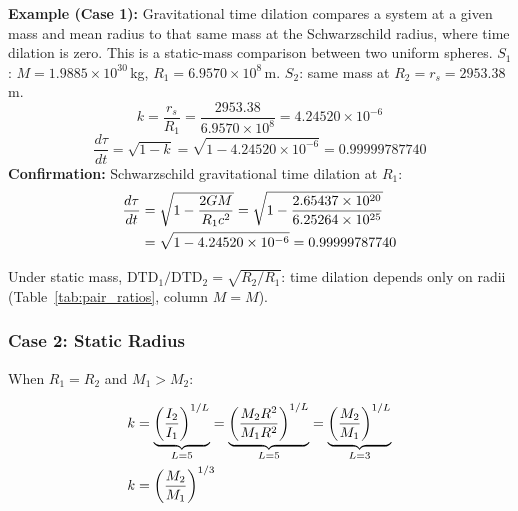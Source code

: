 \documentclass[twoside,twocolumn,9pt]{article}
\begin{document}
\begin{mdframed}
\textbf{Example (Case 1):} Gravitational time dilation compares a system at a given mass and mean radius to that same mass at the Schwarzschild radius, where time dilation is zero. This is a static-mass comparison between two uniform spheres. $S_1$: $M = 1.9885 \times 10^{30}$\,kg, $R_1 = 6.9570 \times 10^{8}$\,m. $S_2$: same mass at $R_2 = r_s = 2953.38$\,m.
\[
k = \frac{r_s}{R_1} = \frac{2953.38}{6.9570 \times 10^{8}} = 4.24520 \times 10^{-6}
\]
\[
\frac{d\tau}{dt} = \sqrt{1 - k} = \sqrt{1 - 4.24520 \times 10^{-6}} = 0.99999787740
\]
\textbf{Confirmation:} Schwarzschild gravitational time dilation at $R_1$:
\begin{align}
\frac{d\tau}{dt} &= \sqrt{1 - \frac{2GM}{R_1 c^2}} = \sqrt{1 - \frac{2.65437 \times 10^{20}}{6.25264 \times 10^{25}}} \notag \\
&= \sqrt{1 - 4.24520 \times 10^{-6}} = 0.99999787740 \notag
\end{align}
\end{mdframed}

\noindent Under static mass, $\text{DTD}_1/\text{DTD}_2 = \sqrt{R_2/R_1}$: time dilation depends only on radii (Table~\ref{tab:pair_ratios}, column $M = M$).

\subsubsection*{Case 2: Static Radius}

When $R_1 = R_2$ and $M_1 > M_2$:

\begin{align}
k &= \underbrace{\left(\frac{I_2}{I_1}\right)^{1/L}}_{L=5} = \underbrace{\left(\frac{M_2 R^2}{M_1 R^2}\right)^{1/L}}_{L=5} = \underbrace{\left(\frac{M_2}{M_1}\right)^{1/L}}_{L=3} \notag \\
k &= \left(\frac{M_2}{M_1}\right)^{1/3}
\end{align}
\end{document}
